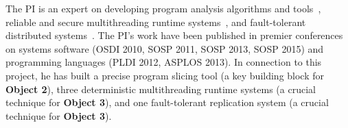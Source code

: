 The PI is an expert on developing program analysis algorithms and 
tools~\cite{wu:pldi12, woodpecker:asplos13, repframe:apsys15}, reliable and 
secure multithreading runtime systems~\cite{smt:cacm, cui:tern:osdi10, 
peregrine:sosp11, parrot:sosp13}, and fault-tolerant distributed 
systems~\cite{crane:sosp15}. The PI's work have been published in 
premier conferences on systems software (OSDI 2010, SOSP 2011, SOSP 2013, SOSP 
2015) and programming languages (PLDI 2012, ASPLOS 2013). In connection to 
this project, he has built a precise program slicing tool (a key building 
block for \textbf{Object 2}), three deterministic multithreading runtime 
systems (a crucial technique for \textbf{Object 3}), and one fault-tolerant 
replication system (a crucial technique for \textbf{Object 3}).


% 


